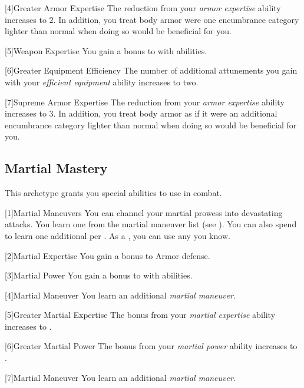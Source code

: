         [4]{Greater Armor Expertise}
        The  reduction from your \textit{armor expertise} ability increases to 2.
        In addition, you treat body armor were one encumbrance category lighter than normal when doing so would be beneficial for you.

        [5]{Weapon Expertise} You gain a  bonus to  with  abilities.

        [6]{Greater Equipment Efficiency} The number of additional attunements you gain with your \textit{efficient equipment} ability increases to two.

        [7]{Supreme Armor Expertise}
        The  reduction from your \textit{armor expertise} ability increases to 3.
        In addition, you treat body armor as if it were an additional encumbrance category lighter than normal when doing so would be beneficial for you.

    \subsection{Martial Mastery}
        This archetype grants you special abilities to use in combat.

        [1]{Martial Maneuvers}
        You can channel your martial prowess into devastating attacks.
        You learn one  from the martial maneuver list (see ).
        You can also spend  to learn one additional  per .
        As a , you can use any  you know.

        [2]{Martial Expertise} You gain a  bonus to Armor defense.

        [3]{Martial Power} You gain a  bonus to  with  abilities.

        [4]{Martial Maneuver}
        You learn an additional \textit{martial maneuver}.

        [5]{Greater Martial Expertise} The bonus from your \textit{martial expertise} ability increases to .

        [6]{Greater Martial Power} The bonus from your \textit{martial power} ability increases to .

        [7]{Martial Maneuver}
        You learn an additional \textit{martial maneuver}.

